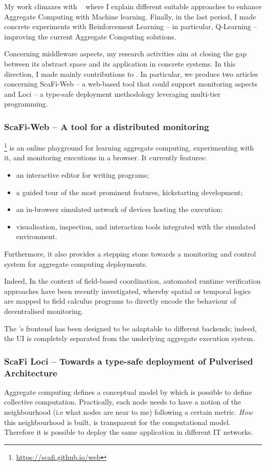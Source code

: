 \documentclass[11pt]{article}
\begin{document}
My work climaxes with ~\cite{research} where I explain different suitable approaches to
enhance Aggregate Computing with Machine learning. Finally, in the last period, I made concrete
experiments with Reinforcement Learning -- in particular, Q-Learning \cite{} -- improving the current Aggregate Computing solutions.

Concerning middleware aspects, my research activities aim at closing the gap between
its abstract space and its application in concrete systems. In this direction, I made mainly contributions to \scafi. In particular, we produce two articles concerning ScaFi-Web -- a web-based tool that could support monitoring aspects and \scafi Loci -- a type-safe deployment methodology leveraging multi-tier programming.
\subsubsection{ScaFi-Web -- A tool for a distributed monitoring}
\scafiweb{}\footnote{\url{https://scafi.github.io/web}}
 is an online playground for learning aggregate computing, experimenting with it, and monitoring executions in a browser.
It currently features:
\begin{itemize}
 \item an interactive editor for writing \scafi{} programs;
 \item a guided tour of the most prominent features, kickstarting development;
 \item an in-browser simulated network of devices hosting the execution;
 \item visualisation, inspection, and interaction tools integrated with the simulated environment.
\end{itemize}

Furthermore, it also provides a stepping stone towards a monitoring and control system for aggregate computing deployments.

Indeed, In the context of field-based coordination, automated runtime verification approaches have been recently investigated, whereby spatial or temporal logics are mapped to field calculus programs to directly encode the behaviour of decentralised monitoring.

The \scafiweb{}'s frontend has been designed to be adaptable to different backends; indeed, the UI is completely separated from the underlying aggregate execution system. 

\subsubsection{ScaFi Loci -- Towards a type-safe deployment of Pulverised Architecture}
Aggregate computing defines a conceptual model by which is possible to define collective computation. Practically, each node needs to have a notion of the neighbourhood (i.e what nodes are near to me) following a certain metric. \textit{How} this neighbourhood is built, is transparent for the computational model. Therefore it is possible to deploy the same application in different IT networks.
\end{document}
